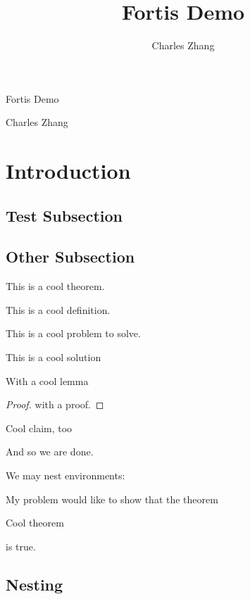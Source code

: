 \documentclass{article}
\title{Fortis Demo}
\author{Charles Zhang}
\begin{document}
\nrl\nrl
\begin{center}
    \huge{Fortis Demo}
    
    \large{Charles Zhang}
\end{center}\nrl
\tableofcontents
\newpage
\section{Introduction}
\subsection{Test Subsection}
\lipsum[1-1]
\subsection{Other Subsection}
\begin{thm}
    This is a cool theorem.
\end{thm}
\lipsum[2-2]
\begin{definition}
    This is a cool definition.
\end{definition}
\lipsum[3-3]
\begin{problem}
    This is a cool problem to solve.
\end{problem}
\begin{solution}
    This is a cool solution
    \begin{lemma}
        With a cool lemma
    \end{lemma}
    \begin{proof}
        with a proof. \lipsum[69-69]
    \end{proof}
    
    \lipsum[71-71]
    \begin{claim}
        Cool claim, too
    \end{claim}
    \lipsum[70-70]
    And so we are done.
\end{solution}

We may nest environments:
\begin{problem}
    My problem would like to show that the theorem
    \begin{thm}
        Cool theorem
    \end{thm}
    is true.
\end{problem}

\lipsum[4-4]

\subsection{Nesting}
\end{document}
